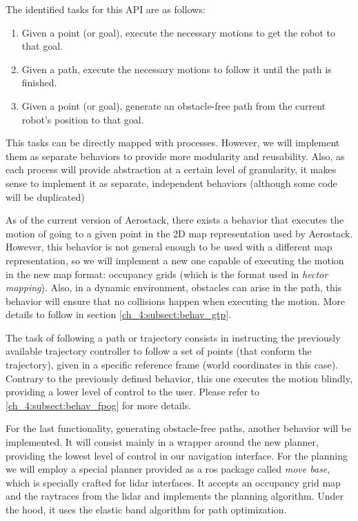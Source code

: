   The identified tasks for this API are as follows:

  \begin{enumerate}
    \item Given a point (or goal), execute the necessary motions to get the robot to that goal.
    \item Given a path, execute the necessary motions to follow it until the path is finished.
    \item Given a point (or goal), generate an obstacle-free path from the current robot's position to that goal.
  \end{enumerate}

  This tasks can be directly mapped with processes. However, we will implement them as separate behaviors to provide more modularity and reusability. Also, as each process will provide abstraction at a certain level of granularity, it makes sense to implement it as separate, independent behaviors (although some code will be duplicated)

  As of the current version of Aerostack, there exists a behavior that executes the motion of going to a given point in the 2D map representation used by Aerostack. However, this behavior is not general enough to be used with a different map representation, so we will implement a new one capable of executing the motion in the new map format: occupancy grids (which is the format used in \textit{hector mapping}). Also, in a dynamic environment, obstacles can arise in the path, this behavior will ensure that no collisions happen when executing the motion. More details to follow in section \ref{ch_4:subsect:behav_gtp}.

  The task of following a path or trajectory consists in instructing the previously available trajectory controller to follow a set of points (that conform the trajectory), given in a specific reference frame (world coordinates in this case). Contrary to the previously defined behavior, this one executes the motion blindly, providing a lower level of control to the user. Please refer to \ref{ch_4:subsect:behav_fpog} for more details.

  For the last functionality, generating obstacle-free paths, another behavior will be implemented. It will consist mainly in a wrapper around the new planner, providing the lowest level of control in our navigation interface. For the planning we will employ a special planner provided as a ros package called \textit{move base}, which is specially crafted for lidar interfaces. It accepts an occupancy grid map and the raytraces from the lidar and implements the planning algorithm. Under the hood, it uses the elastic band algorithm for path optimization.

